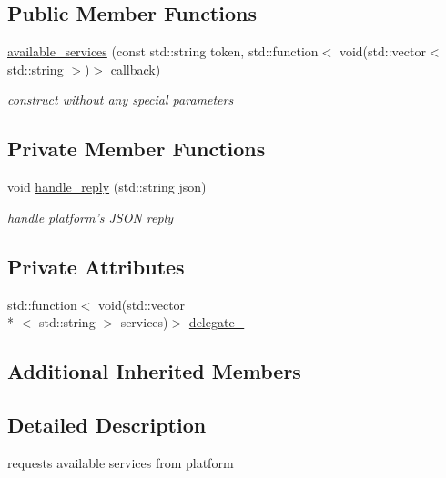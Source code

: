 \subsection*{Public Member Functions}
\begin{DoxyCompactItemize}
\item 
\hyperlink{classrapp_1_1cloud_1_1available__services_a73a3a384f525cf630ff926289b2c49eb}{available\-\_\-services} (const std\-::string token, std\-::function$<$ void(std\-::vector$<$ std\-::string $>$)$>$ callback)
\begin{DoxyCompactList}\small\item\em construct without any special parameters \end{DoxyCompactList}\end{DoxyCompactItemize}
\subsection*{Private Member Functions}
\begin{DoxyCompactItemize}
\item 
void \hyperlink{classrapp_1_1cloud_1_1available__services_a3467e87138e848a7d403e2d9e91bbb91}{handle\-\_\-reply} (std\-::string json)
\begin{DoxyCompactList}\small\item\em handle platform's J\-S\-O\-N reply \end{DoxyCompactList}\end{DoxyCompactItemize}
\subsection*{Private Attributes}
\begin{DoxyCompactItemize}
\item 
std\-::function$<$ void(std\-::vector\\*
$<$ std\-::string $>$ services)$>$ \hyperlink{classrapp_1_1cloud_1_1available__services_a550d37b97cb866b77b6ef60121256311}{delegate\-\_\-}
\end{DoxyCompactItemize}
\subsection*{Additional Inherited Members}


\subsection{Detailed Description}
requests available services from platform 

